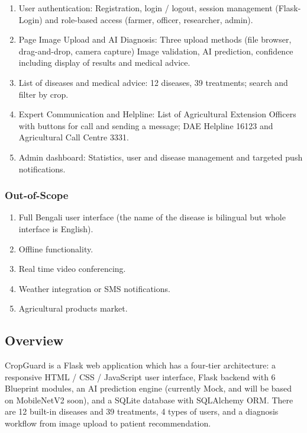 \documentclass[12pt,a4paper]{article}
\begin{document}
\begin{enumerate}[leftmargin=2em]
  \item User authentication: Registration, login / logout, session management (Flask-Login) and role-based access (farmer, officer, researcher, admin).
  \item Page Image Upload and AI Diagnosis: Three upload methods (file browser, drag-and-drop, camera capture) Image validation, AI prediction, confidence including display of results and medical advice.
  \item List of diseases and medical advice: 12 diseases, 39 treatments; search and filter by crop.
  \item Expert Communication and Helpline: List of Agricultural Extension Officers with buttons for call and sending a message; DAE Helpline 16123 and Agricultural Call Centre 3331.
  \item Admin dashboard: Statistics, user and disease management and targeted push notifications.
\end{enumerate}

\subsubsection*{Out-of-Scope}

\begin{enumerate}[leftmargin=2em]
  \item Full Bengali user interface (the name of the disease is bilingual but whole interface is English).
  \item Offline functionality.
  \item Real time video conferencing.
  \item Weather integration or SMS notifications.
  \item Agricultural products market.
\end{enumerate}

\subsection{Overview}

CropGuard is a Flask web application which has a four-tier architecture: a responsive HTML / CSS / JavaScript user interface, Flask backend with 6 Blueprint modules, an AI prediction engine (currently Mock, and will be based on MobileNetV2 soon), and a SQLite database with SQLAlchemy ORM. There are 12 built-in diseases and 39 treatments, 4 types of users, and a diagnosis workflow from image upload to patient recommendation.
\end{document}
